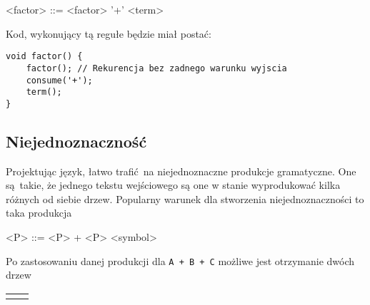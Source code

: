 \documentclass[leqno, 12pt]{article}
\newcommand{\spacing}{\vskip 0.5cm}
\begin{document}
		    \begin{grammar}
		    	<factor> ::= <factor> '+' <term>
			\end{grammar}

			\spacing

			Kod, wykonujący tą regułe będzie miał postać:
			
			\spacing

\begin{lstlisting}[label={lst:left-recursion}]
void factor() {
	factor(); // Rekurencja bez zadnego warunku wyjscia
	consume('+');
	term();
}
\end{lstlisting}
		
		\subsection{Niejednoznaczność}
		
			Projektując język, łatwo trafić na niejednoznaczne produkcje gramatyczne. One są takie, że
			jednego tekstu wejściowego są one w stanie wyprodukować kilka różnych od siebie drzew. Popularny
			warunek dla stworzenia niejednoznaczności to taka produkcja
			
			\begin{grammar}
		        <P> ::= <P> + <P>
				\alt <symbol>
			\end{grammar}
			
			
			Po zastosowaniu danej produkcji dla \texttt{A + B + C} możliwe jest otrzymanie dwóch drzew
			
			\spacing
			\spacing

			\begin{center}
				\begin{tabular}{ L{5cm} L{5cm} }
					&
				\end{tabular}
			\end{center}
			
\end{document}
